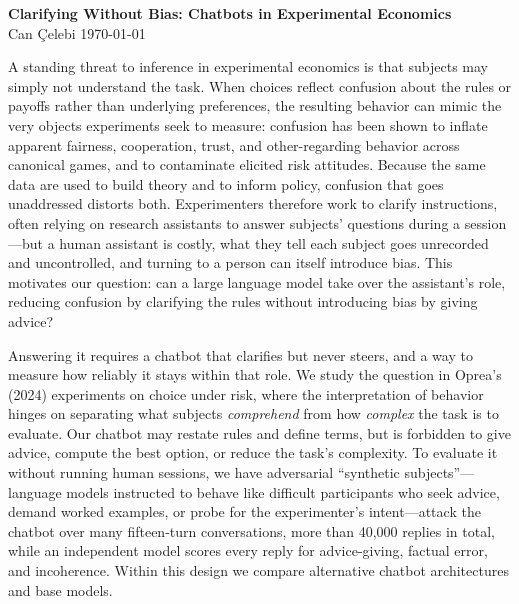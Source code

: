 \documentclass[11pt]{article}
\begin{document}
\thispagestyle{empty}

\begin{center}
{\large\bfseries Clarifying Without Bias: Chatbots in Experimental Economics}\\[3pt]
{\small Can \c{C}elebi \quad\textperiodcentered\quad \today}
\end{center}
\vspace{0.6em}

A standing threat to inference in experimental economics is that subjects may simply not understand the
task. When choices reflect confusion about the rules or payoffs rather than underlying preferences, the
resulting behavior can mimic the very objects experiments seek to measure: confusion has been shown to
inflate apparent fairness, cooperation, trust, and other-regarding behavior across canonical games, and
to contaminate elicited risk attitudes. Because the same data are used to build theory and to inform
policy, confusion that goes unaddressed distorts both. Experimenters therefore work to clarify
instructions, often relying on research assistants to answer subjects' questions during a session---but
a human assistant is costly, what they tell each subject goes unrecorded and uncontrolled, and turning to
a person can itself introduce bias. This motivates our question: can a large language model take over the assistant's
role, reducing confusion by clarifying the rules without introducing bias by giving advice?

\medskip
Answering it requires a chatbot that clarifies but never steers, and a way to measure how reliably it
stays within that role. We study the question in Oprea's (2024) experiments on choice under risk, where
the interpretation of behavior hinges on separating what subjects \emph{comprehend} from how
\emph{complex} the task is to evaluate. Our chatbot may restate rules and define terms, but is forbidden
to give advice, compute the best option, or reduce the task's complexity. To evaluate it without running
human sessions, we have adversarial ``synthetic subjects''---language models instructed to behave like
difficult participants who seek advice, demand worked examples, or probe for the experimenter's
intent---attack the chatbot over many fifteen-turn conversations, more than 40{,}000 replies in total,
while an independent model scores every reply for advice-giving, factual error, and incoherence. Within
this design we compare alternative chatbot architectures and base models.
\end{document}

